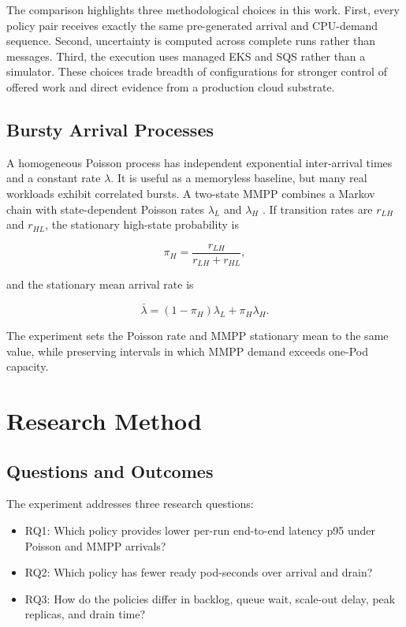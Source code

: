 \documentclass[conference]{IEEEtran}
\begin{document}
The comparison highlights three methodological choices in this work. First,
every policy pair receives exactly the same pre-generated arrival and CPU-demand
sequence. Second, uncertainty is computed across complete runs rather than
messages. Third, the execution uses managed EKS and SQS rather than a simulator.
These choices trade breadth of configurations for stronger control of offered
work and direct evidence from a production cloud substrate.

\subsection{Bursty Arrival Processes}

A homogeneous Poisson process has independent exponential inter-arrival times
and a constant rate $\lambda$. It is useful as a memoryless baseline, but many
real workloads exhibit correlated bursts. A two-state MMPP combines a Markov
chain with state-dependent Poisson rates $\lambda_L$ and $\lambda_H$
\cite{Fischer1993MMPP}. If transition rates are $r_{LH}$ and $r_{HL}$, the
stationary high-state probability is

\begin{equation}
  \pi_H=\frac{r_{LH}}{r_{LH}+r_{HL}},
\end{equation}

and the stationary mean arrival rate is

\begin{equation}
  \bar{\lambda}=(1-\pi_H)\lambda_L+\pi_H\lambda_H.
\end{equation}

The experiment sets the Poisson rate and MMPP stationary mean to the same value,
while preserving intervals in which MMPP demand exceeds one-Pod capacity.

\section{Research Method}

\subsection{Questions and Outcomes}

The experiment addresses three research questions:

\begin{itemize}
  \item RQ1: Which policy provides lower per-run end-to-end latency p95 under
  Poisson and MMPP arrivals?
  \item RQ2: Which policy has fewer ready pod-seconds over arrival and drain?
  \item RQ3: How do the policies differ in backlog, queue wait, scale-out delay,
  peak replicas, and drain time?
\end{itemize}
\end{document}
